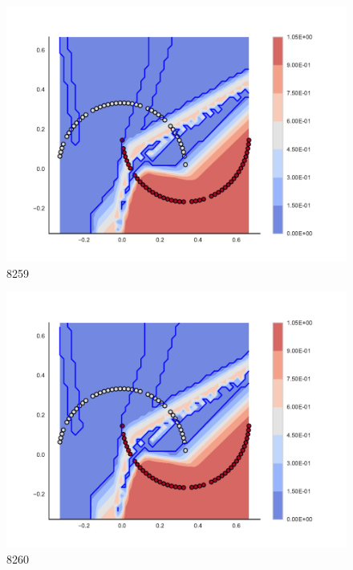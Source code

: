 \begin{subfigure}[b]{0.09\textwidth}
    \includegraphics[clip, trim=2.35cm 1.75cm 4.5cm 0cm,width=\textwidth]{img/convergence/8259.pdf}
    \caption{8259}
    \label{fig:convergence_8259}
\end{subfigure}
%
\begin{subfigure}[b]{0.09\textwidth}
    \includegraphics[clip, trim=2.35cm 1.75cm 4.5cm 0cm,width=\textwidth]{img/convergence/8260.pdf}
    \caption{8260}
    \label{fig:convergence_8260}
\end{subfigure}
%
